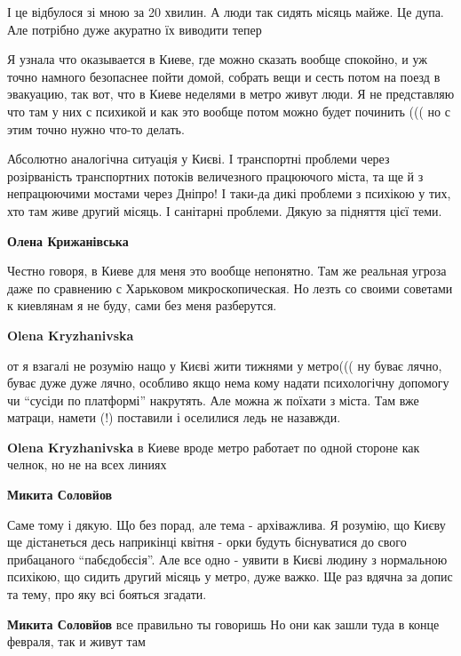 \begin{itemize}
І це відбулося зі мною за 20 хвилин. А люди так сидять місяць майже. Це дупа.
Але потрібно дуже акуратно їх виводити тепер


Я узнала что оказывается в Киеве, где можно сказать вообще спокойно, и уж точно
намного безопаснее пойти домой, собрать вещи и сесть потом на поезд в
эвакуацию, так вот, что в Киеве неделями в метро живут люди. Я не представляю
что там у них с психикой и как это вообще потом можно будет починить ((( но с
этим точно нужно что-то делать.


Абсолютно аналогічна ситуація у Києві. І транспортні проблеми через
розірваність транспортних потоків величезного працюючого міста, та ще й з
непрацюючими мостами через Дніпро! І таки-да дикі проблеми з психікою у тих,
хто там живе другий місяць. І санітарні проблеми. Дякую за підняття цієї теми.

\begin{itemize} %
\textbf{Олена Крижанівська} 

Честно говоря, в Киеве для меня это вообще непонятно. Там же реальная угроза
даже по сравнению с Харьковом микроскопическая. Но лезть со своими советами к
киевлянам я не буду, сами без меня разберутся.

\textbf{Olena Kryzhanivska} 

от я взагалі не розумію нащо у Києві жити тижнями у метро((( ну буває лячно,
буває дуже дуже лячно, особливо якщо нема кому надати психологічну допомогу чи
\enquote{сусіди по платформі} накрутять. Але можна ж поїхати з міста. Там вже матраци,
намети (!) поставили і оселилися ледь не назавжди.

\textbf{Olena Kryzhanivska} в Киеве вроде метро работает по одной стороне как челнок, но не на всех линиях

\textbf{Микита Соловйов} 

Саме тому і дякую. Що без порад, але тема - архіважлива. Я розумію, що Києву ще
дістанеться десь наприкінці квітня - орки будуть біснуватися до свого
прибацаного \enquote{пабєдобєсія}. Але все одно - уявити в Києві людину з нормальною
психікою, що сидить другий місяць у метро, дуже важко. Ще раз вдячна за допис
та тему, про яку всі бояться згадати.

\textbf{Микита Соловйов} все правильно ты говоришь
Но они как зашли туда в конце февраля, так и живут там


\end{itemize}
\end{itemize}

